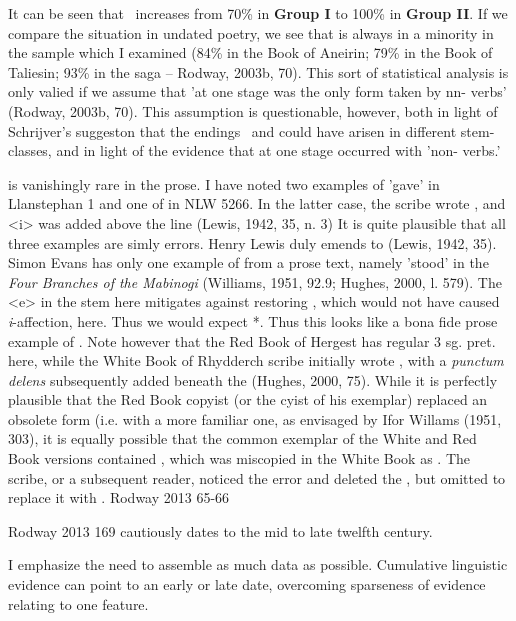 It can be seen that \ei\ increases from 70\% in \textbf{Group I} to 100\% in \textbf{Group II}. If we compare the situation in undated poetry, we see that  is always in a minority in the sample which I examined (84\%  in the Book of Aneirin; 79\% in the Book of Taliesin; 93\% in the saga  -- Rodway, 2003b, 70). This sort of statistical analysis is only valied if we assume that 'at one stage  was the only form taken by nn- verbs' (Rodway, 2003b, 70). This assumption is questionable, however, both in light of Schrijver's suggeston that the endings \ei\ and  could have arisen in different stem-classes, and in light of the evidence that  at one stage occurred with 'non- verbs.'

 is vanishingly rare in the prose. I have noted two examples of  'gave' in Llanstephan 1 and one of  in NLW 5266. In the latter case, the  scribe wrote , and <i> was added above the line (Lewis, 1942, 35, n. 3) It is quite plausible that all three examples are simly errors. Henry Lewis duly emends  to  (Lewis, 1942, 35). Simon Evans has only one example of  from a prose text, namely  'stood' in the \textit{Four Branches of the Mabinogi} (Williams, 1951, 92.9; Hughes, 2000, l. 579). The <e> in the stem here mitigates against restoring , which would not have caused \textit{i}-affection, here. Thus we would expect *. Thus this looks like a bona fide prose example of . Note however that the Red Book of Hergest has regular 3 sg. pret.  here, while the White Book of Rhydderch scribe initially wrote , with a \textit{punctum delens} subsequently added beneath the  (Hughes, 2000, 75). While it is perfectly plausible that the Red Book copyist (or the cyist of his exemplar) replaced an obsolete form (i.e.  with a more familiar one, as envisaged by Ifor Willams (1951, 303), it is equally possible that the common exemplar of the White and Red Book versions contained , which was miscopied in the White Book as . The scribe, or a subsequent reader, noticed the error and deleted the , but omitted to replace it with . 
Rodway 2013 65-66

Rodway 2013 169 cautiously dates  to the mid to late twelfth century.

I emphasize the need to assemble as much data as possible. Cumulative linguistic evidence can point to an early or late date, overcoming sparseness of evidence relating to one feature. 

